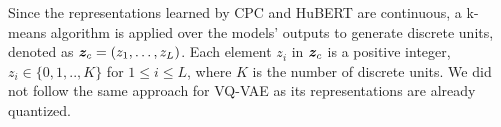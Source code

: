 Since the representations learned by CPC and HuBERT are continuous, a k-means algorithm is applied over the models' outputs to generate discrete units, denoted as $\bm{z}_c = (z_1,\ldots,z_{L})$. Each element $z_i$ in $\bm{z}_c$ is a positive integer, $z_i\in\{0,1,..,K\}$ for $1\le i \le L$, where $K$ is the number of discrete units. We did not follow the same approach for VQ-VAE as its representations are already quantized.





